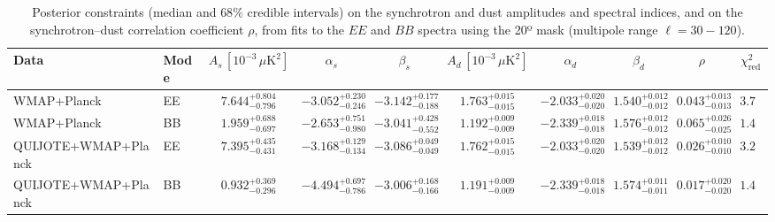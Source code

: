 \begin{table}[h]
\centering
\scriptsize
\setlength{\tabcolsep}{4pt}
\caption{Posterior constraints (median and $68\%$ credible intervals) on the synchrotron and dust amplitudes and spectral indices, and on the synchrotron--dust correlation coefficient $\rho$, from fits to the $EE$ and $BB$ spectra using the 20º mask (multipole range $\ell=30-120$).}
\label{tab:fit_results}
\begin{tabular}{llcccccccc}
\toprule
Data & Mode & $A_s\,[10^{-3}\,\mu\mathrm{K}^2]$ & $\alpha_s$ & $\beta_s$ & $A_d\,[10^{-3}\,\mu\mathrm{K}^2]$ & $\alpha_d$ & $\beta_d$ & $\rho$ & $\chi^2_\mathrm{red}$ \\
\midrule
WMAP+Planck & EE & $7.644^{+0.804}_{-0.796}$ & $-3.052^{+0.230}_{-0.246}$ & $-3.142^{+0.177}_{-0.188}$ & $1.763^{+0.015}_{-0.015}$ & $-2.033^{+0.020}_{-0.020}$ & $1.540^{+0.012}_{-0.012}$ & $0.043^{+0.013}_{-0.013}$ & $3.75$ \\
WMAP+Planck & BB & $1.959^{+0.688}_{-0.697}$ & $-2.653^{+0.751}_{-0.980}$ & $-3.041^{+0.428}_{-0.552}$ & $1.192^{+0.009}_{-0.009}$ & $-2.339^{+0.018}_{-0.018}$ & $1.576^{+0.012}_{-0.012}$ & $0.065^{+0.026}_{-0.025}$ & $1.46$ \\
QUIJOTE+WMAP+Planck & EE & $7.395^{+0.435}_{-0.431}$ & $-3.168^{+0.129}_{-0.134}$ & $-3.086^{+0.049}_{-0.049}$ & $1.762^{+0.015}_{-0.015}$ & $-2.033^{+0.020}_{-0.020}$ & $1.539^{+0.012}_{-0.012}$ & $0.026^{+0.010}_{-0.010}$ & $3.26$ \\
QUIJOTE+WMAP+Planck & BB & $0.932^{+0.369}_{-0.296}$ & $-4.494^{+0.697}_{-0.786}$ & $-3.006^{+0.168}_{-0.166}$ & $1.191^{+0.009}_{-0.009}$ & $-2.339^{+0.018}_{-0.018}$ & $1.574^{+0.011}_{-0.011}$ & $0.017^{+0.020}_{-0.020}$ & $1.44$ \\
\bottomrule
\end{tabular}
\end{table}
